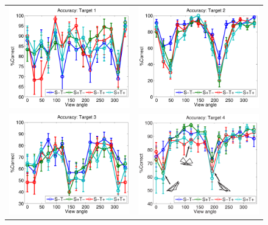 \documentclass[dwyatte_dissertation.tex]{subfiles}
\begin{document}
\begin{figure}[h!]
\begin{center}
\begin{tabular}{ll}
\includegraphics[width=80mm]{figs/chap_bpleast/results_accuracy_rot_obj1.pdf} &
\includegraphics[width=80mm]{figs/chap_bpleast/results_accuracy_rot_obj2.pdf} \\
\includegraphics[width=80mm]{figs/chap_bpleast/results_accuracy_rot_obj3.pdf} &
\includegraphics[width=80mm]{figs/chap_bpleast/results_accuracy_rot_obj4_montage.pdf} \\

\end{tabular}
\end{center}
\end{figure}
\end{document}
